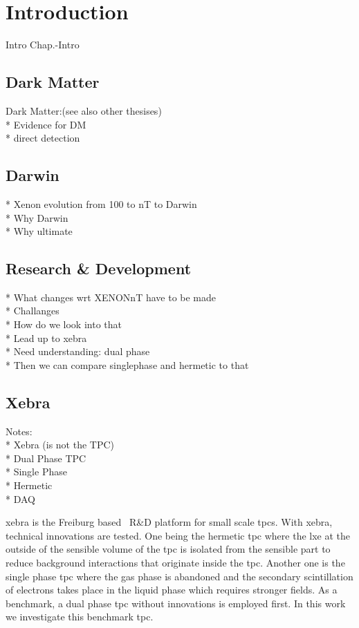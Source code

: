 \chapter{Introduction}
\label{chap:Intro}

Intro Chap.-Intro

\FloatBarrier
\section{Dark Matter}
\label{sec:DarkMatter}
\FloatBarrier

Dark Matter:(see also other thesises) \\
* Evidence for DM \\
* direct detection


\newpage
\FloatBarrier
\section{Darwin}
\label{sec:Darwin}
\FloatBarrier

* Xenon evolution from 100 to nT to Darwin \\
* Why Darwin \\
* Why ultimate


\newpage
\FloatBarrier
\section{Research \& Development}
\label{sec:RnD}
\FloatBarrier

* What changes wrt XENONnT have to be made \\
* Challanges \\
* How do we look into that \\
* Lead up to xebra \\
* Need understanding: dual phase \\
* Then we can compare singlephase and hermetic to that


\newpage
\FloatBarrier
\section{Xebra}
\label{sec:Xebra}
\FloatBarrier

Notes: \\
* Xebra (is not the TPC) \\
* Dual Phase TPC \\
* Single Phase \\
* Hermetic \\
* DAQ

\gls{xebra} is the Freiburg based \darwin~R\&D platform for small scale \glspl{tpc}.
With \gls{xebra}, technical innovations are tested.
One being the hermetic \gls{tpc} where the \gls{lxe} at the outside of the sensible volume of the \gls{tpc} is isolated from the sensible part to reduce background interactions that originate inside the \gls{tpc}.
Another one is the single phase \gls{tpc} where the gas phase is abandoned and the secondary scintillation of electrons takes place in the liquid phase which requires stronger fields.
As a benchmark, a dual phase \gls{tpc} without innovations is employed first.
In this work we investigate this benchmark \gls{tpc}.


